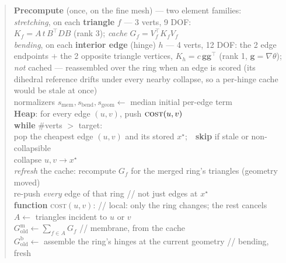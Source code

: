 \begin{quote}\small
\textbf{Precompute} (once, on the fine mesh) --- two element families: \\
\hspace*{1.5em} \emph{stretching}, on each \textbf{triangle} $f$ --- 3 verts, 9 DOF: \\
\hspace*{3em} $K_f=A\,t\,B^\top D B$ (rank 3); \emph{cache} $G_f=V_f^\top K_f V_f$ \\
\hspace*{1.5em} \emph{bending}, on each \textbf{interior edge} (hinge) $h$ --- 4 verts, 12 DOF: the 2 edge endpoints $+$ the 2 opposite triangle vertices, $K_h=c\,\mathbf{g}\mathbf{g}^\top$ (rank 1, $\mathbf{g}=\nabla\theta$); \emph{not} cached --- reassembled over the ring when an edge is scored (its dihedral reference drifts under every nearby collapse, so a per-hinge cache would be stale at once) \\
\hspace*{1.5em} normalizers $s_{\text{mem}},s_{\text{bend}},s_{\text{geom}}\leftarrow$ median initial per-edge term \\[3pt]
\textbf{Heap}: for every edge $(u,v)$, push $\textsc{cost}(u,v)$ \\[3pt]
\textbf{while} \#verts $>$ target: \\
\hspace*{1.5em} pop the cheapest edge $(u,v)$ and its stored $x^\star$;\ \ \textbf{skip} if stale or non-collapsible \\
\hspace*{1.5em} collapse $u,v\to x^\star$ \\
\hspace*{1.5em} \emph{refresh} the cache: recompute $G_f$ for the merged ring's triangles (geometry moved) \\
\hspace*{1.5em} re-push \emph{every} edge of that ring \hfill // not just edges at $x^\star$ \\[3pt]
\textbf{function} \textsc{cost}$(u,v)$: \hfill // local: only the ring changes; the rest cancels \\
\hspace*{1.5em} $A\leftarrow$ triangles incident to $u$ or $v$ \\
\hspace*{1.5em} $G^{\mathrm m}_{\text{old}}\leftarrow\sum_{f\in A}G_f$ \hfill // membrane, from the cache \\
\hspace*{1.5em} $G^{\mathrm b}_{\text{old}}\leftarrow$ assemble the ring's hinges at the current geometry \hfill // bending, fresh \\

\end{quote}

